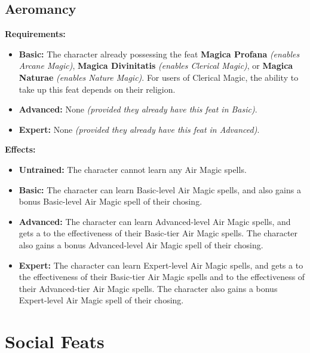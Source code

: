 \documentclass[openany,10pt,a4paper]{book}
\begin{document}
\begin{itemize}
\begin{itemize}
\begin{itemize}
\begin{itemize}
\subsection{Aeromancy}
\begin{table}[!ht]
\centering
{}
\end{table}
\textbf{Requirements:}
\begin{itemize}
	\item \textbf{Basic:} The character already possessing the feat \textbf{Magica Profana} \textit{(enables Arcane Magic)}, \textbf{Magica Divinitatis} \textit{(enables Clerical Magic)}, or \textbf{Magica Naturae} \textit{(enables Nature Magic)}. For users of Clerical Magic, the ability to take up this feat depends on their religion.
	\item \textbf{Advanced:} None \textit{(provided they already have this feat in Basic)}.
	\item \textbf{Expert:} None \textit{(provided they already have this feat in Advanced)}.
\end{itemize}
\textbf{Effects:}
\begin{itemize}
	\item \textbf{Untrained:} The character cannot learn any Air Magic spells.
	\item \textbf{Basic:} The character can learn Basic-level Air Magic spells, and also gains a bonus Basic-level Air Magic spell of their chosing.
	\item \textbf{Advanced:} The character can learn Advanced-level Air Magic spells, and gets a  to the effectiveness of their Basic-tier Air Magic spells. The character also gains a bonus Advanced-level Air Magic spell of their chosing.
	\item \textbf{Expert:} The character can learn Expert-level Air Magic spells, and gets a  to the effectiveness of their Basic-tier Air Magic spells and  to the effectiveness of their Advanced-tier Air Magic spells. The character also gains a bonus Expert-level Air Magic spell of their chosing.
\end{itemize}\newpage
\section{Social Feats}

\end{itemize}
\end{itemize}
\end{itemize}
\end{itemize}
\end{document}
